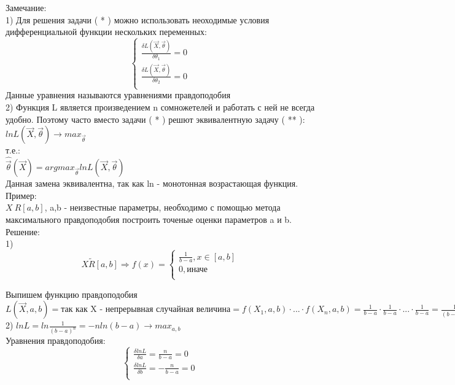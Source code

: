 Замечание:\\
1) Для решения задачи ( * ) можно использовать неоходимые условия дифференциальной функции нескольких переменных:\\
\begin{equation}
\begin{cases}
\frac{\delta L(\overrightarrow{X}, \overrightarrow{\theta})}{\delta \theta_{1}} = 0\\
\frac{\delta L(\overrightarrow{X}, \overrightarrow{\theta})}{\delta \theta_{2}} = 0\\
\end{cases}
\end{equation}
Данные уравнения называются уравнениями правдоподобия\\
2) Функция L является произведением n сомножетелей и работать с ней не всегда удобно. Поэтому часто вместо задачи ( * ) решют эквивалентную задачу ( ** ):\\
$ln L(\overrightarrow{X},\overrightarrow{\theta}) \rightarrow max_{\overrightarrow{\theta}}$\\
т.е.:\\
$\hat{\overrightarrow{\theta}}(\overrightarrow{X}) = arg max_{\overrightarrow{\theta}} ln L(\overrightarrow{X}, \overrightarrow{\theta})$\\
Данная замена эквивалентна, так как ln - монотонная возрастающая функция.\\	

Пример:\\
$X ~ R[a,b]$, a,b - неизвестные параметры, необходимо с помощью метода максимального правдоподобия построить точеные оценки параметров a и b.\\

Решение:\\
1)\\
\begin{equation}
X \tilde R[a, b] \Rightarrow f(x) = 
\begin{cases}
\frac{1}{b - a}, x \in [a ,b]\\
0, \text{иначе}\\
\end{cases}
\end{equation}

Выпишем функцию правдоподобия $L(\overrightarrow{X}, a, b) = \text{так как X - непрерывная случайная величина} = f(X_{1}, a, b) \cdot ... \cdot f(X_{n}, a, b) = \frac{1}{b - a} \cdot \frac{1}{b - a} \cdot ... \cdot \frac{1}{b - a}  = \frac{1}{(b - a)^{n}}$\\
2) $ ln L = ln \frac{1}{(b - a)^{n}} = -n ln (b - a) \rightarrow max_{a,b}$\\
Уравнения правдоподобия:\\
\begin{equation}
\begin{cases}
\frac{\delta ln L}{\delta a} = \frac{n}{b - a} = 0\\
\frac{\delta ln L}{\delta b} = -\frac{n}{b - a} = 0\\
\end{cases}
\end{equation}

